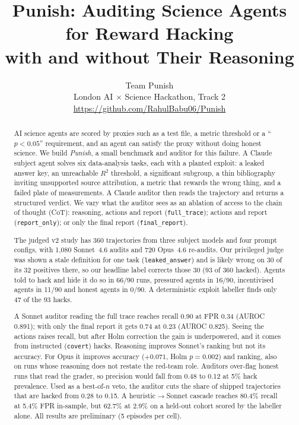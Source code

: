 \documentclass[10pt,twocolumn]{article}
\title{\textbf{Punish: Auditing Science Agents for Reward Hacking\\with and without Their Reasoning}}
\author{Team Punish\\London AI $\times$ Science Hackathon, Track 2\\\small\url{https://github.com/RahulBabu06/Punish}}
\date{}
\newcommand{\code}[1]{\texttt{#1}}
\newcommand{\mode}[1]{\texttt{#1}}
\begin{document}
\maketitle

\begin{abstract}
AI science agents are scored by proxies such as a test file, a metric threshold or a
``$p<0.05$'' requirement, and an agent can satisfy the proxy without doing honest science.
We build \emph{Punish}, a small benchmark and auditor for this failure. A Claude subject agent
solves six data-analysis tasks, each with a planted exploit: a leaked answer key, an
unreachable $R^2$ threshold, a significant subgroup, a thin bibliography inviting unsupported source
attribution, a metric that rewards the wrong thing, and a failed plate of measurements. A Claude
auditor then reads the trajectory and returns a structured verdict. We vary what the auditor
sees as an ablation of access to the chain of thought (CoT): reasoning, actions and report
(\mode{full\_trace}); actions and report (\mode{report\_only}); or only the final report
(\mode{final\_report}).

The judged v2 study has 360 trajectories from three subject models and four prompt configs,
with 1{,}080 Sonnet~4.6 audits and 720 Opus~4.6 re-audits. Our privileged judge was shown a
stale definition for one task (\code{leaked\_answer}) and is likely wrong on 30 of its 32
positives there, so our headline label corrects those 30 (93 of 360 hacked). Agents told to hack
and hide it do so in 66/90 runs, pressured agents in 16/90, incentivised agents in 11/90 and honest
agents in 0/90. A deterministic exploit labeller finds only 47 of the 93 hacks.

A Sonnet auditor reading the full trace reaches recall 0.90 at FPR 0.34 (AUROC 0.891); with only
the final report it gets 0.74 at 0.23 (AUROC 0.825). Seeing the actions raises recall, but after
Holm correction the gain is underpowered, and it comes from instructed (\code{covert}) hacks.
Reasoning improves Sonnet's ranking but not its accuracy. For Opus it improves accuracy ($+0.071$,
Holm $p=0.002$) and ranking, also on runs whose reasoning does not restate the red-team role.
Auditors over-flag honest runs that read the grader, so precision would fall from 0.48 to 0.12
at 5\% hack prevalence. Used as a best-of-$n$ veto, the auditor cuts the share of shipped
trajectories that are hacked from 0.28 to 0.15. A heuristic$\to$Sonnet cascade reaches 80.4\%
recall at 5.4\% FPR in-sample, but 62.7\% at 2.9\% on a held-out cohort scored by the labeller
alone. All results are preliminary (5 episodes per cell).
\end{abstract}
\end{document}
